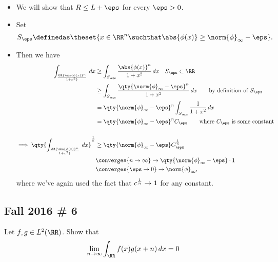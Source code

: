 \begin{solution}
\begin{itemize}
\tightlist
\item
  We will show that \(R\leq L + \eps\) for every \(\eps>0\).
\item
  Set
  \begin{align*}  
  S_\eps \definedas \theset{x\in \RR^n\suchthat \abs{\phi(x)} \geq \norm{\phi}_\infty - \eps}
  .\end{align*}
\item
  Then we have
  \begin{align*}  
  \int_\RR {\abs{\phi(x)}^n \over 1 +x^2}\,dx
  &\geq \int_{S_\eps} {\abs{\phi(x)}^n \over 1 +x^2}\,dx \quad S_\eps \subset \RR \\
  &\geq \int_{S_\eps} { \qty{\norm{\phi}_\infty - \eps}^n \over 1 +x^2}\,dx  \qquad\text{by definition of }S_\eps \\
  &= \qty{\norm{\phi}_\infty - \eps}^n \int_{S_\eps} { 1 \over 1 +x^2}\,dx \\
  &= \qty{\norm{\phi}_\infty - \eps}^n C_\eps \qquad\text{where $C_\eps$ is some constant} \\ \\
  \implies 
  \qty{ \int_\RR {\abs{\phi(x)}^n \over 1 +x^2}\,dx }^{1\over n} 
  &\geq \qty{\norm{\phi}_\infty - \eps} C_\eps^{1 \over n} \\
  &\converges{n\to\infty}\to
  \qty{\norm{\phi}_\infty - \eps} \cdot 1 \\
  &\converges{\eps\to 0}\to \norm{\phi}_\infty
  ,\end{align*} where we've again used the fact that
  \(c^{1\over n} \to 1\) for any constant.
\end{itemize}

\end{solution}

\hypertarget{fall-2016-6}{%
\subsection{Fall 2016 \# 6}\label{fall-2016-6}}

Let \(f, g \in L^2(\RR)\). Show that
\begin{align*}
\lim _{n \to \infty} \int _{\RR} f(x) g(x+n) \,dx = 0
\end{align*}

